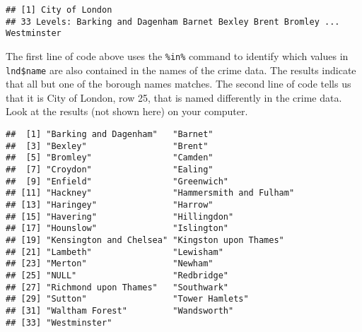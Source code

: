 \documentclass[]{article}
\newenvironment{Shaded}{}{}
\newcommand{\KeywordTok}[1]{\textcolor[rgb]{0.00,0.44,0.13}{\textbf{{#1}}}}
\newcommand{\DecValTok}[1]{\textcolor[rgb]{0.25,0.63,0.44}{{#1}}}
\newcommand{\StringTok}[1]{\textcolor[rgb]{0.25,0.44,0.63}{{#1}}}
\newcommand{\CommentTok}[1]{\textcolor[rgb]{0.38,0.63,0.69}{\textit{{#1}}}}
\newcommand{\NormalTok}[1]{{#1}}
\begin{document}
\begin{Shaded}
\end{Shaded}

\begin{verbatim}
## [1] City of London
## 33 Levels: Barking and Dagenham Barnet Bexley Brent Bromley ... Westminster
\end{verbatim}

The first line of code above uses the \texttt{\%in\%} command to
identify which values in \texttt{lnd\$name} are also contained in the
names of the crime data. The results indicate that all but one of the
borough names matches. The second line of code tells us that it is City
of London, row 25, that is named differently in the crime data. Look at
the results (not shown here) on your computer.

\begin{Shaded}
\end{Shaded}

\begin{verbatim}
##  [1] "Barking and Dagenham"   "Barnet"                
##  [3] "Bexley"                 "Brent"                 
##  [5] "Bromley"                "Camden"                
##  [7] "Croydon"                "Ealing"                
##  [9] "Enfield"                "Greenwich"             
## [11] "Hackney"                "Hammersmith and Fulham"
## [13] "Haringey"               "Harrow"                
## [15] "Havering"               "Hillingdon"            
## [17] "Hounslow"               "Islington"             
## [19] "Kensington and Chelsea" "Kingston upon Thames"  
## [21] "Lambeth"                "Lewisham"              
## [23] "Merton"                 "Newham"                
## [25] "NULL"                   "Redbridge"             
## [27] "Richmond upon Thames"   "Southwark"             
## [29] "Sutton"                 "Tower Hamlets"         
## [31] "Waltham Forest"         "Wandsworth"            
## [33] "Westminster"
\end{verbatim}

\begin{Shaded}
\end{Shaded}
\end{document}

